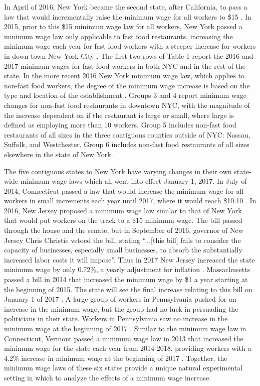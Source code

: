 \documentclass[11pt]{article}
\begin{document}
 In April of 2016, New York became the second state, after California, to pass a law that would incrementally raise the minimum wage for all workers to \$15 \cite{nybill}. In 2015, prior to this \$15 minimum wage law for all workers, New York passed a minimum wage law only applicable to fast food restaurants, increasing the minimum wage each year for fast food workers with a steeper increase for workers in down town New York City \cite{nyff}. The first two rows of Table 1 report the 2016 and 2017 minimum wages for fast food workers in both NYC and in the rest of the state. In the more recent 2016 New York minimum wage law, which applies to non-fast food workers, the degree of the minimum wage increase is based on the type and location of the establishment \cite{nybill}. Groups 3 and 4 report minimum wage changes for non-fast food restaurants in downtown NYC, with the magnitude of the increase dependent on if the restaurant is large or small, where large is defined as employing more than 10 workers. Group 5 includes non-fast food restaurants of all sizes in the three contiguous counties outside of NYC: Nassau, Suffolk, and Westchester. Group 6 includes non-fast food restaurants of all sizes elsewhere in the state of New York. 
 
The five contiguous states to New York have varying changes in their own state-wide minimum wage laws which all went into effect January 1, 2017.  In July of 2014, Connecticut passed a law that would increase the minimum wage for all workers in small increments each year until 2017, where it would reach \$10.10 \cite{ctbill}. In 2016, New Jersey proposed a minimum wage law similar to that of New York that would put workers on the track to a \$15 minimum wage. The bill passed through the house and the senate, but in September of 2016, governor of New Jersey Chris Christie vetoed the bill, stating ``...[this bill] fails to consider the capacity of businesses, especially small businesses, to absorb the substantially increased labor costs it will impose''\cite{njveto}. Thus in 2017 New Jersey increased the state minimum wage by only 0.72\%, a yearly adjustment for inflation \cite{njbill}. Massachusetts passed a bill in 2014 that increased the minimum wage by \$1 a year starting at the beginning of 2015. The state will see the final increase relating to this bill on January 1 of 2017 \cite{mabill}. A large group of workers in Pennsylvania pushed for an increase in the minimum wage, but the group had no luck in persuading the politicians in their state. Workers in Pennsylvania saw no increase in the minimum wage at the beginning of 2017 \cite{panobill}. Similar to the minimum wage law in Connecticut, Vermont passed a minimum wage law in 2013 that increased the minimum wage for the state each year from 2014-2018, providing workers with a 4.2\% increase in minimum wage at the beginning of 2017 \cite{vtbill}. Together, the minimum wage laws of these six states provide a unique natural experimental setting in which to analyze the effects of a minimum wage increase. 
\end{document}
